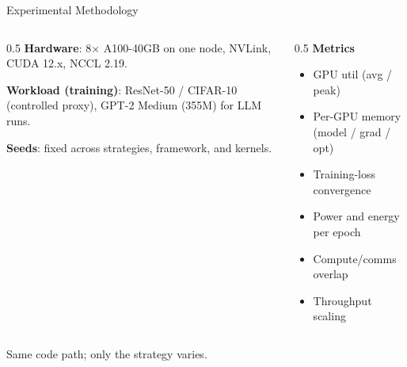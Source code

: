 \documentclass[10pt,aspectratio=169]{beamer}
\begin{document}
\begin{frame}{Experimental Methodology}
  \begin{columns}[T]
    \begin{column}{0.5\textwidth}
      \textbf{Hardware}: 8$\times$ A100-40GB on one node,
      NVLink, CUDA 12.x, NCCL 2.19.

      \textbf{Workload (training)}: ResNet-50 / CIFAR-10
      (controlled proxy), GPT-2 Medium (355M)
      for LLM runs.

      \textbf{Seeds}: fixed across strategies, framework, and
      kernels.
    \end{column}
    \begin{column}{0.5\textwidth}
      \textbf{Metrics}
      \begin{itemize}\footnotesize
        \item GPU util (avg / peak)
        \item Per-GPU memory (model / grad / opt)
        \item Training-loss convergence
        \item Power and energy per epoch
        \item Compute/comms overlap
        \item Throughput scaling
      \end{itemize}
    \end{column}
  \end{columns}
  \vspace{2ex}
  \centering
  \alert{Same code path; only the strategy varies.}
\end{frame}
\end{document}
